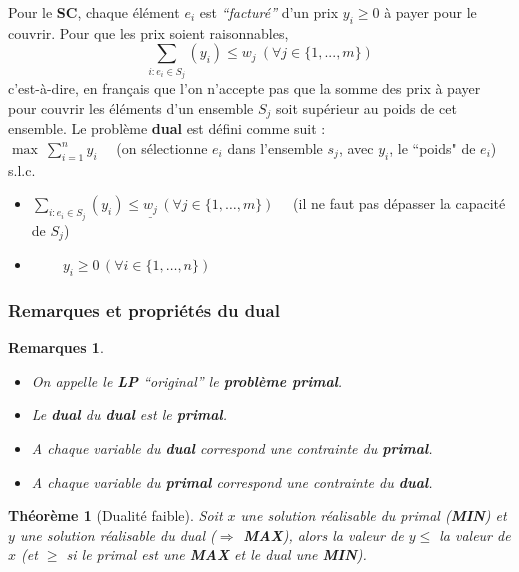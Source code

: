 \documentclass[12pt]{article}
\newcommand{\titre}[1]{\textcolor{title}{#1}}
\newtheorem{rems}{Remarques}[section]
\newtheorem{thm}{Th\'eor\`eme}[section]
\begin{document}
Pour le \textbf{\titre{SC}}, chaque élément $e_i$ est \textit{``facturé''} d'un
prix $y_i \geq 0$ à payer pour le couvrir. Pour que les prix soient
raisonnables,
$$\sum_{i:e_i\in S_j} (y_i) \leq w_j\ (\forall j \in \{1,...,m\})$$
c'est-à-dire, en français que l'on n'accepte pas que la somme des prix à payer
pour couvrir les éléments d'un ensemble $S_j$ soit supérieur au poids de cet
ensemble. Le problème \textbf{dual} est défini comme suit :\\

$\max\ \sum_{i=1}^n y_i \quad $ {\small (on sélectionne $e_i$ dans l'ensemble $s_j$, avec
	$y_i$, le ``poids" de $e_i$)}\\
\indent s.l.c.
\begin{itemize}
\item $\sum_{i:e_i \in S_j}(y_i) \leq \underline{w_j}\, (\forall j \in \{1,\ldots ,m\}) \quad $ {\small (il ne faut pas dépasser la capacité de $S_j$)}\\
\item $\qquad\ y_i \geq 0\, (\forall i \in \{1,\ldots ,n\})$
\end{itemize}

\subsubsection{Remarques et propriétés du dual}

\begin{rems}
$ $
\begin{itemize}
	\item On appelle le \textbf{\titre{LP}} ``original'' le
	\textbf{problème primal}.
	\item Le \textbf{dual} du \textbf{dual} est le \textbf{primal}.
	\item A chaque variable du \textbf{dual} correspond une contrainte du
	\textbf{primal}.
	\item A chaque variable du \textbf{primal} correspond une contrainte du
	\textbf{dual}.
\end{itemize}
\end{rems}

\begin{thm}[\titre{Dualité faible}] Soit $x$ une solution réalisable du primal
(\textbf{MIN}) et $y$ une solution réalisable du dual (\textbf{$\Rightarrow$
MAX}), alors la valeur de $y \leq$ la valeur de $x$ (et $\geq$ si le primal est
une \textbf{MAX} et le dual une \textbf{MIN}).
\end{thm}
\end{document}
